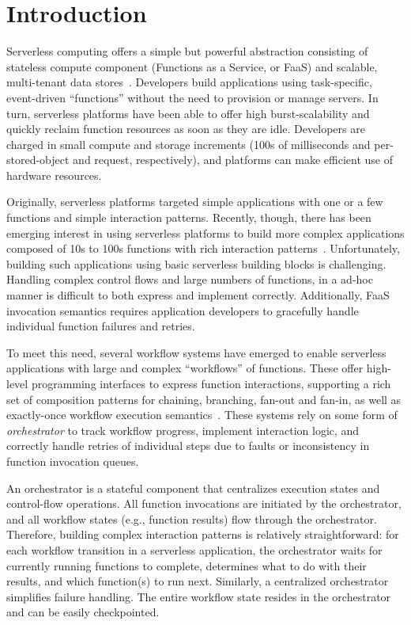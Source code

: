 \section{Introduction}

Serverless computing offers a simple but powerful abstraction consisting of
stateless compute component (Functions as a Service, or FaaS) and scalable,
multi-tenant data stores~\cite{berkeley}. Developers build applications using
task-specific, event-driven ``functions'' without the need to provision or
manage servers. In turn, serverless platforms have been able to offer high
burst-scalability and quickly reclaim function resources as soon as they are
idle. Developers are charged in small compute and storage increments (100s of
milliseconds and per-stored-object and request, respectively), and platforms
can make efficient use of hardware resources.

Originally, serverless platforms targeted simple applications with one or a few
functions and simple interaction patterns. Recently, though, there has been
emerging interest in using serverless platforms to build more complex
applications composed of 10s to 100s functions with rich interaction
patterns~\cite{excamera, pywren, gg-atc, beldi, boki}. Unfortunately, building
such applications using basic serverless building blocks is challenging.
Handling complex control flows and large numbers of functions, in a ad-hoc
manner is difficult to both express and implement correctly.  Additionally, FaaS
invocation semantics requires application developers to gracefully handle
individual function failures and retries.

To meet this need, several workflow systems have emerged to enable serverless
applications with large and complex ``workflows'' of functions. These offer
high-level programming interfaces to express function interactions, supporting a
rich set of composition patterns for chaining, branching, fan-out and fan-in, as
well as exactly-once workflow execution semantics~\cite{excamera, gg-atc,
aws-step-functions, google-cloud-composer, google-workflows, durable-functions}.
These systems rely on some form of \emph{orchestrator} to track workflow
progress, implement interaction logic, and correctly handle retries of
individual steps due to faults or inconsistency in function invocation queues.

An orchestrator is a stateful component that centralizes execution states and
control-flow operations. All function invocations are initiated by the
orchestrator, and all workflow states (e.g., function results) flow through the
orchestrator. Therefore, building complex interaction patterns is relatively
straightforward: for each workflow transition in a serverless application, the
orchestrator waits for currently running functions to complete, determines what
to do with their results, and which function(s) to run next. Similarly, a
centralized orchestrator simplifies failure handling. The entire workflow state
resides in the orchestrator and can be easily checkpointed.

